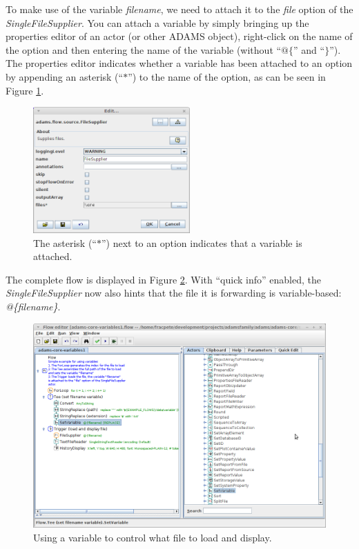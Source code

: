To make use of the variable \textit{filename}, we need to attach it to the
\textit{file} option of the \textit{SingleFileSupplier}. You can attach a
variable by simply bringing up the properties editor of an actor (or other
ADAMS object), right-click on the name of the option and then entering the name
of the variable (without ``$@\{$'' and ``$\}$''). The properties editor
indicates whether a variable has been attached to an option by appending an asterisk
(``$*$'') to the name of the option, as can be seen in Figure
\ref{floweditor-variables1_flow-detail}.
\begin{figure}[htb]
  \centering
  \includegraphics[width=6.0cm]{images/floweditor-variables1_flow-detail.png}
  \caption{The asterisk (``$*$'') next to an option indicates that a variable is
  attached.}
  \label{floweditor-variables1_flow-detail}
\end{figure}

The complete flow is displayed in Figure \ref{floweditor-variables1_flow}. With
``quick info'' enabled, the \textit{SingleFileSupplier} now also hints that the
file it is forwarding is variable-based: \textit{@\{filename\}}.
\begin{figure}[htb]
  \centering
  \includegraphics[width=12.0cm]{images/floweditor-variables1_flow.png}
  \caption{Using a variable to control what file to load and display.}
  \label{floweditor-variables1_flow}
\end{figure}

